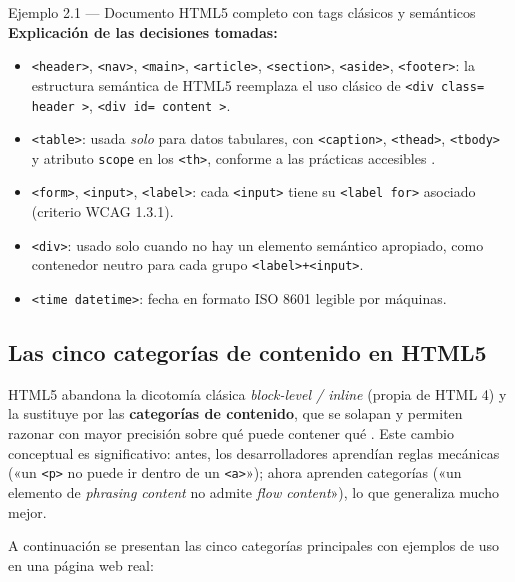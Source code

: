 \documentclass[11pt,a4paper,openany]{book}
\begin{document}
\begin{cajaejemplo}{Ejemplo 2.1 --- Documento HTML5 completo con tags clásicos y semánticos}
\textbf{Explicación de las decisiones tomadas:}
\begin{itemize}
\item \texttt{<header>}, \texttt{<nav>}, \texttt{<main>},
\texttt{<article>}, \texttt{<section>}, \texttt{<aside>},
\texttt{<footer>}: la estructura semántica de HTML5 reemplaza el uso
clásico de \texttt{<div class= header >}, \texttt{<div id= content >}.
\item \texttt{<table>}: usada \emph{solo} para datos tabulares, con
\texttt{<caption>}, \texttt{<thead>}, \texttt{<tbody>} y atributo
\texttt{scope} en los \texttt{<th>}, conforme a las prácticas
accesibles \cite{robbins2018learning}.
\item \texttt{<form>}, \texttt{<input>}, \texttt{<label>}: cada
\texttt{<input>} tiene su \texttt{<label for>} asociado (criterio
WCAG 1.3.1).
\item \texttt{<div>}: usado solo cuando no hay un elemento semántico
apropiado, como contenedor neutro para cada grupo \texttt{<label>+<input>}.
\item \texttt{<time datetime>}: fecha en formato ISO 8601 legible
por máquinas.
\end{itemize}
\end{cajaejemplo}

\subsection{Las cinco categorías de contenido en HTML5}

HTML5 abandona la dicotomía clásica \emph{block-level / inline}
(propia de HTML 4) y la sustituye por las \textbf{categorías de
contenido}, que se solapan y permiten razonar con mayor precisión
sobre qué puede contener qué \cite{hickson2014html5}. Este cambio
conceptual es significativo: antes, los desarrolladores aprendían
reglas mecánicas («un \texttt{<p>} no puede ir dentro de un
\texttt{<a>}»); ahora aprenden categorías («un elemento de
\emph{phrasing content} no admite \emph{flow content}»), lo que
generaliza mucho mejor.

A continuación se presentan las cinco categorías principales con
ejemplos de uso en una página web real:
\end{document}
